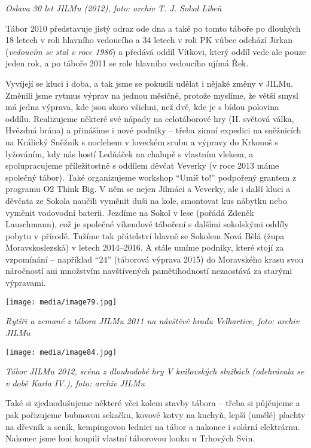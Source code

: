 \emph{Oslava 30 let JILMu (2012), foto: archiv T. J. Sokol Libeň}

Tábor 2010 představuje jistý odraz ode dna a také po tomto táboře po
dlouhých 18 letech v roli hlavního vedoucího a 34 letech v roli PK vůbec
odchází Jirkan (\emph{vedoucím se stal v roce 1986}) a předává oddíl
Vítkovi, který oddíl vede ale pouze jeden rok, a po táboře 2011 se role
hlavního vedoucího ujímá Řek.

Vyvíjejí se kluci i doba, a tak jsme se pokusili udělat i nějaké změny v
JILMu. Změnili jsme rytmus výprav na jednou měsíčně, protože myslíme, že
větší smysl má jedna výprava, kde jsou skoro všichni, než dvě, kde je s
bídou polovina oddílu. Realizujeme některé své nápady na celotáborové
hry (II. světová válka, Hvězdná brána) a přinášíme i nové podniky --
třeba zimní expedici na sněžnicích na Králický Sněžník s noclehem v
loveckém srubu a výpravy do Krkonoš s lyžováním, kdy nás hostí Ledňáček
na chalupě s vlastním vlekem, a spolupracujeme příležitostně s oddílem
děvčat Veverky (v roce 2013 máme společný tábor). Také organizujeme
workshop ``Umíš to!'' podpořený grantem z programu O2 Think Big. V něm
se nejen Jilmáci a Veverky, ale i další kluci a děvčata ze Sokola
naučili vyměnit duši na kole, smontovat kus nábytku nebo vyměnit
vodovodní baterii. Jezdíme na Sokol v lese (pořádá Zdeněk Lauschmann),
což je společné víkendové táboření s dalšími sokolskými oddíly pobytu v
přírodě. Tužíme tak přátelství hlavně se Sokolem Nová Bělá (župa
Moravskoslezská) v letech 2014--2016. A stále umíme podniky, které stojí
za vzpomínání -- například ``24'' (táborová výprava 2015) do Moravského
krasu svou náročností ani množstvím navštívených pamětihodností
nezaostává za starými výpravami.

\texttt{[image: media/image79.jpg]}

\emph{Rytíři a zemané z tábora JILMu 2011 na návštěvě hradu Velhartice,
foto: archiv JILMu}

\texttt{[image: media/image84.jpg]}

\emph{Tábor JILMu 2012, scéna z dlouhodobé hry V královských službách
(odehrávala se v době Karla IV.), foto: archiv JILMu}

Také si zjednodušujeme některé věci kolem stavby tábora -- třeba si
půjčujeme a pak pořizujeme bubnovou sekačku, kovové kotvy na kuchyň,
lepší (umělé) plachty na dřevník a seník, kempingovou lednici na tábor a
nakonec i solární elektrárnu. Nakonec jsme loni koupili vlastní
táborovou louku u Trhových Svin.

